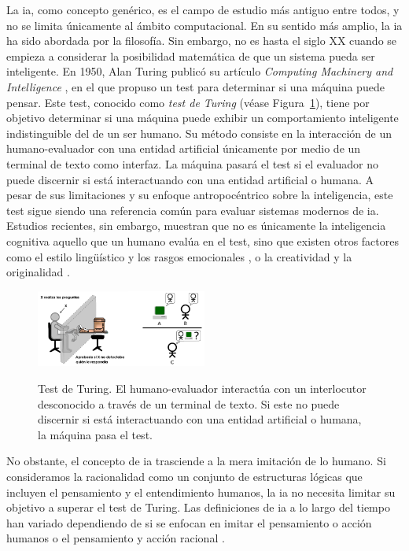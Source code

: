 La \gls{ia}, como concepto genérico, es el campo de estudio más antiguo entre todos, y no se limita únicamente al ámbito computacional. En su sentido más amplio, la \gls{ia} ha sido abordada por la filosofía. 
Sin embargo, no es hasta el siglo XX cuando se empieza a considerar la posibilidad matemática de que un sistema pueda ser inteligente. En 1950, Alan Turing publicó su artículo \emph{Computing Machinery and Intelligence} \citep{alan1950a}, en el que propuso un test para determinar si una máquina puede pensar. Este test, conocido como \emph{test de Turing} (véase Figura~\ref{fig:test_turing}), tiene por objetivo determinar si una máquina puede exhibir un comportamiento inteligente indistinguible del de un ser humano. Su método consiste en la interacción de un humano-evaluador con una entidad artificial únicamente por medio de un terminal de texto como interfaz. La máquina pasará el test si el evaluador no puede discernir si está interactuando con una entidad artificial o humana. A pesar de sus limitaciones y su enfoque antropocéntrico sobre la inteligencia, este test sigue siendo una referencia común para evaluar sistemas modernos de \gls{ia}. Estudios recientes, sin embargo, muestran que no es únicamente la inteligencia cognitiva aquello que un humano evalúa en el test, sino que existen otros factores como el estilo lingüístico y los rasgos emocionales \citep{jonesDoesGPT4Pass2023}, o la creatividad y la originalidad \citep{noeverTuringDeception2022}.

\begin{figure}[H]
    \caption[Test de Turing]{Test de Turing. El humano-evaluador interactúa con un interlocutor desconocido a través de un terminal de texto. Si este no puede discernir si está interactuando con una entidad artificial o humana, la máquina pasa el test.}
    \centering
    \includegraphics[width=0.5\textwidth]{./figuras/test_turing.png}
    \label{fig:test_turing}
\end{figure}

No obstante, el concepto de \gls{ia} trasciende a la mera imitación de lo humano. Si consideramos la racionalidad como un conjunto de estructuras lógicas que incluyen el pensamiento y el entendimiento humanos, la \gls{ia} no necesita limitar su objetivo a superar el test de Turing. Las definiciones de \gls{ia} a lo largo del tiempo han variado dependiendo de si se enfocan en imitar el pensamiento o acción humanos o el pensamiento y acción racional \citep{RussellStuartJ2021AI:A}.

